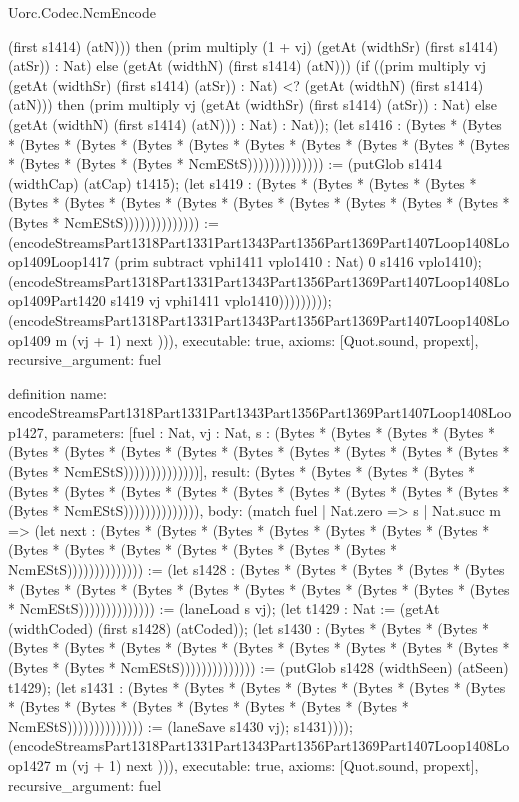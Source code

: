 \begin{lexlean}{Uorc.Codec.NcmEncode}
\begin{semanticmodule}
{(first s1414) (atN))) then (prim multiply (1 + vj) (getAt (widthSr) (first s1414) (atSr)) : Nat) else (getAt (widthN) (first s1414) (atN))) (if ((prim multiply vj (getAt (widthSr) (first s1414) (atSr)) : Nat) <? (getAt (widthN) (first s1414) (atN))) then (prim multiply vj (getAt (widthSr) (first s1414) (atSr)) : Nat) else (getAt (widthN) (first s1414) (atN))) : Nat) : Nat)); (let s1416 : (Bytes * (Bytes * (Bytes * (Bytes * (Bytes * (Bytes * (Bytes * (Bytes * (Bytes * (Bytes * (Bytes * (Bytes * (Bytes * (Bytes * NcmEStS)))))))))))))) := (putGlob s1414 (widthCap) (atCap) t1415); (let s1419 : (Bytes * (Bytes * (Bytes * (Bytes * (Bytes * (Bytes * (Bytes * (Bytes * (Bytes * (Bytes * (Bytes * (Bytes * (Bytes * (Bytes * NcmEStS)))))))))))))) := (encodeStreamsPart1318Part1331Part1343Part1356Part1369Part1407Loop1408Loop1409Loop1417 (prim subtract vphi1411 vplo1410 : Nat) 0 s1416 vplo1410); (encodeStreamsPart1318Part1331Part1343Part1356Part1369Part1407Loop1408Loop1409Part1420 s1419 vj vphi1411 vplo1410))))))))); (encodeStreamsPart1318Part1331Part1343Part1356Part1369Part1407Loop1408Loop1409 m (vj + 1) next ))),
  executable: true,
  axioms: [Quot.sound, propext],
  recursive_argument: fuel
}

definition{
  name: encodeStreamsPart1318Part1331Part1343Part1356Part1369Part1407Loop1408Loop1427,
  parameters: [fuel : Nat, vj : Nat, s : (Bytes * (Bytes * (Bytes * (Bytes * (Bytes * (Bytes * (Bytes * (Bytes * (Bytes * (Bytes * (Bytes * (Bytes * (Bytes * (Bytes * NcmEStS))))))))))))))],
  result: (Bytes * (Bytes * (Bytes * (Bytes * (Bytes * (Bytes * (Bytes * (Bytes * (Bytes * (Bytes * (Bytes * (Bytes * (Bytes * (Bytes * NcmEStS)))))))))))))),
  body: (match fuel
    | Nat.zero => s
    | Nat.succ m => (let next : (Bytes * (Bytes * (Bytes * (Bytes * (Bytes * (Bytes * (Bytes * (Bytes * (Bytes * (Bytes * (Bytes * (Bytes * (Bytes * (Bytes * NcmEStS)))))))))))))) := (let s1428 : (Bytes * (Bytes * (Bytes * (Bytes * (Bytes * (Bytes * (Bytes * (Bytes * (Bytes * (Bytes * (Bytes * (Bytes * (Bytes * (Bytes * NcmEStS)))))))))))))) := (laneLoad s vj); (let t1429 : Nat := (getAt (widthCoded) (first s1428) (atCoded)); (let s1430 : (Bytes * (Bytes * (Bytes * (Bytes * (Bytes * (Bytes * (Bytes * (Bytes * (Bytes * (Bytes * (Bytes * (Bytes * (Bytes * (Bytes * NcmEStS)))))))))))))) := (putGlob s1428 (widthSeen) (atSeen) t1429); (let s1431 : (Bytes * (Bytes * (Bytes * (Bytes * (Bytes * (Bytes * (Bytes * (Bytes * (Bytes * (Bytes * (Bytes * (Bytes * (Bytes * (Bytes * NcmEStS)))))))))))))) := (laneSave s1430 vj); s1431)))); (encodeStreamsPart1318Part1331Part1343Part1356Part1369Part1407Loop1408Loop1427 m (vj + 1) next ))),
  executable: true,
  axioms: [Quot.sound, propext],
  recursive_argument: fuel
}


\end{semanticmodule}
\end{lexlean}
